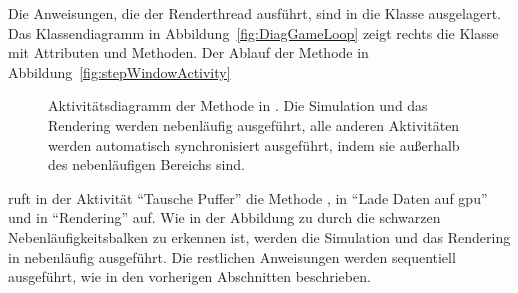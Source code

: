 Die Anweisungen, die der Renderthread ausführt, sind in die Klasse  ausgelagert. Das Klassendiagramm in Abbildung~\vref{fig:DiagGameLoop} zeigt rechts die Klasse  mit Attributen und Methoden. Der Ablauf der Methode  in Abbildung~\vref{fig:stepWindowActivity}
\begin{figure}
	\centering
	
	\caption{Aktivitätsdiagramm der Methode  in . Die Simulation und das Rendering werden nebenläufig ausgeführt, alle anderen Aktivitäten werden automatisch synchronisiert ausgeführt, indem sie außerhalb des nebenläufigen Bereichs sind.}\label{fig:stepWindowActivity}
\end{figure}
ruft  in der Aktivität \enquote{Tausche Puffer} die Methode , in \enquote{Lade Daten auf \ac{gpu}}  und in \enquote{Rendering}  auf. Wie in der Abbildung zu durch die schwarzen Nebenläufigkeitsbalken zu erkennen ist, werden die Simulation und das Rendering in  nebenläufig ausgeführt. Die restlichen Anweisungen werden sequentiell ausgeführt, wie in den vorherigen Abschnitten beschrieben.